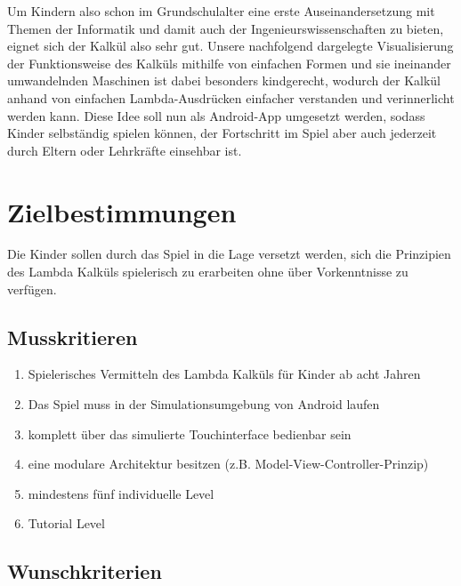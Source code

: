 \documentclass{scrartcl}
\begin{document}
Um Kindern also schon im Grundschulalter eine erste Auseinandersetzung
mit Themen der Informatik und damit auch der Ingenieurswissenschaften
zu bieten, eignet sich der Kalkül also sehr gut. Unsere nachfolgend
dargelegte Visualisierung der Funktionsweise des Kalküls mithilfe
von einfachen Formen und sie ineinander umwandelnden Maschinen ist
dabei besonders kindgerecht, wodurch der Kalkül anhand von einfachen
Lambda-Ausdrücken einfacher verstanden und verinnerlicht werden kann.
Diese Idee soll nun als Android-App umgesetzt werden, sodass Kinder
selbständig spielen können, der Fortschritt im Spiel aber auch jederzeit
durch Eltern oder Lehrkräfte einsehbar ist. 

\clearpage









\section{Zielbestimmungen}


Die Kinder sollen durch das Spiel in die Lage versetzt werden, sich die Prinzipien des Lambda Kalküls spielerisch zu erarbeiten ohne über Vorkenntnisse zu verfügen.

\subsection{Musskritieren}

\begin{enumerate}
	\item \label{muss:vermittelnlamba}Spielerisches Vermitteln des Lambda Kalküls für Kinder ab acht Jahren
	\item \label{muss:simulationandroid}Das Spiel muss in der Simulationsumgebung von Android laufen
	\item \label{muss:touchinterface}komplett über das simulierte Touchinterface bedienbar sein
	\item \label{muss:mvc}eine modulare Architektur besitzen (z.B. Model-View-Controller-Prinzip)
	\item \label{muss:5indilevel}mindestens fünf individuelle Level
	\item \label{muss:tutorial}Tutorial Level
\end{enumerate}

\subsection{Wunschkriterien}
\end{document}
